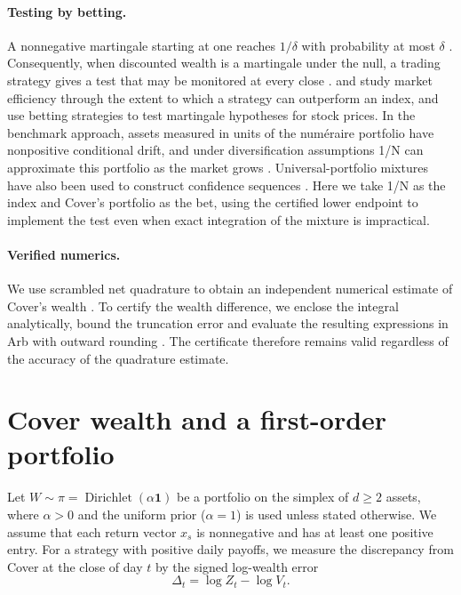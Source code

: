 \documentclass{article}
\numberwithin{equation}{section}
\theoremstyle{remark}
\newcommand{\one}{\mathbf 1}
\begin{document}
\paragraph{Testing by betting.}
A nonnegative martingale starting at one reaches $1/\delta$ with probability
at most $\delta$ \citep{ville1939}. Consequently, when discounted wealth
is a martingale under the null, a trading strategy gives a test that may be
monitored at every close \citep{shafer2019game,ramdas2023game}.
\citet{vovk2011efficient} and \citet{vovk2016probabilityfree} study market
efficiency through the extent to which a strategy can outperform an index,
and \citet{takeuchi2011new} use betting strategies to test martingale
hypotheses for stock prices. In the benchmark approach, assets measured in
units of the num\'eraire portfolio have nonpositive conditional drift, and
under diversification assumptions 1/N can approximate this portfolio as
the market grows \citep{platen2012approximating}. Universal-portfolio
mixtures have also been used to construct confidence sequences
\citep{orabona2024,ryu2024gambling}. Here we take 1/N as the index and
Cover's portfolio as the bet, using the certified lower endpoint to implement
the test even when exact integration of the mixture is impractical.

\paragraph{Verified numerics.}
We use scrambled net quadrature to obtain an independent numerical estimate
of Cover's wealth \citep{owen1997}. To certify the wealth difference, we
enclose the integral analytically, bound the truncation error and evaluate
the resulting expressions in Arb with outward rounding
\citep{rump2010,johansson2017arb}. The certificate therefore remains valid
regardless of the accuracy of the quadrature estimate.

\section{Cover wealth and a first-order portfolio}
\label{sec:setup}

Let $W\sim\pi=\operatorname{Dirichlet}(\alpha\one)$ be a portfolio on the
simplex of $d\ge2$ assets, where $\alpha>0$ and the uniform prior
($\alpha=1$) is used unless stated otherwise. We assume that each return
vector $x_s$ is nonnegative and has at least one positive entry. For a
strategy with positive daily payoffs, we measure the discrepancy from
Cover at the close of day $t$ by the signed log-wealth error
\begin{equation}
  \Delta_t=\log Z_t-\log V_t .
  \label{eq:fidelity}
\end{equation}
\end{document}
